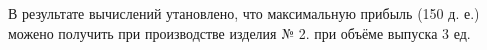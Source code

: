 \documentclass[russian,utf8,nocolumnxxxi,nocolumnxxxii]{eskdtext}
\begin{document}
В результате вычислений утановлено, что максимальную прибыль (150 д. е.) можено получить при производстве изделия № 2. при объёме выпуска 3 ед.



	
\end{document}
